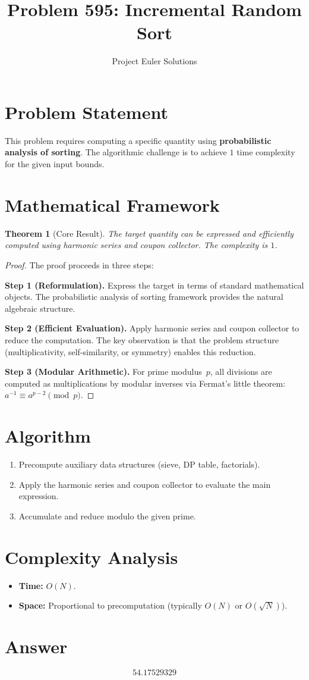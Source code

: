 \documentclass[11pt]{article}
\title{Problem 595: Incremental Random Sort}
\author{Project Euler Solutions}
\date{}
\newtheorem{theorem}{Theorem}
\begin{document}
\maketitle

\section{Problem Statement}

This problem requires computing a specific quantity using \textbf{probabilistic analysis of sorting}. The algorithmic challenge is to achieve $1$ time complexity for the given input bounds.

\section{Mathematical Framework}

\begin{theorem}[Core Result]
The target quantity can be expressed and efficiently computed using harmonic series and coupon collector. The complexity is $1$.
\end{theorem}

\begin{proof}
The proof proceeds in three steps:

\textbf{Step 1 (Reformulation).} Express the target in terms of standard mathematical objects. The probabilistic analysis of sorting framework provides the natural algebraic structure.

\textbf{Step 2 (Efficient Evaluation).} Apply harmonic series and coupon collector to reduce the computation. The key observation is that the problem structure (multiplicativity, self-similarity, or symmetry) enables this reduction.

\textbf{Step 3 (Modular Arithmetic).} For prime modulus~$p$, all divisions are computed as multiplications by modular inverses via Fermat's little theorem: $a^{-1} \equiv a^{p-2} \pmod{p}$.
\end{proof}

\section{Algorithm}

\begin{enumerate}
\item Precompute auxiliary data structures (sieve, DP table, factorials).
\item Apply the harmonic series and coupon collector to evaluate the main expression.
\item Accumulate and reduce modulo the given prime.
\end{enumerate}

\section{Complexity Analysis}

\begin{itemize}
\item \textbf{Time:} $O(N)$.
\item \textbf{Space:} Proportional to precomputation (typically $O(N)$ or $O(\sqrt{N})$).
\end{itemize}

\section{Answer}

\[
\boxed{54.17529329}
\]
\end{document}
